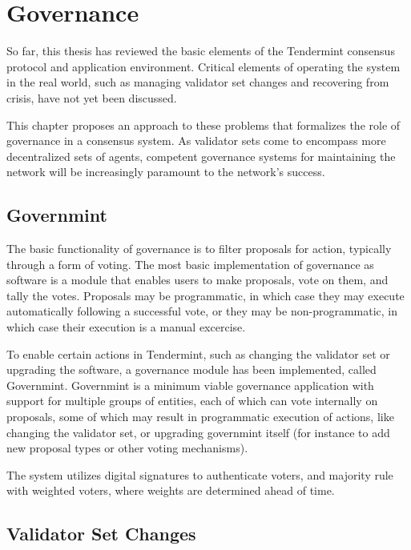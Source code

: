 \chapter{Governance}
\label{ch:governance}

So far, this thesis has reviewed the basic elements of the Tendermint consensus protocol and application environment.
Critical elements of operating the system in the real world, such as managing validator set changes
and recovering from crisis, have not yet been discussed. 

This chapter proposes an approach to these problems that formalizes the role of governance in a consensus system.
As validator sets come to encompass more decentralized sets of agents, competent governance systems 
for maintaining the network will be increasingly paramount to the network's success.

\section{Governmint}

The basic functionality of governance is to filter proposals for action, typically through a form of voting.
The most basic implementation of governance as software is a module that enables users to make proposals,
vote on them, and tally the votes. 
Proposals may be programmatic, in which case they may execute automatically following a successful vote,
or they may be non-programmatic, in which case their execution is a manual excercise.

To enable certain actions in Tendermint, such as changing the validator set or upgrading the software,
a governance module has been implemented, called Governmint.
Governmint is a minimum viable governance application with support for multiple groups of entities,
each of which can vote internally on proposals, some of which may result in programmatic execution of actions,
like changing the validator set, or upgrading governmint itself (for instance to add new proposal types or other voting mechanisms).

The system utilizes digital signatures to authenticate voters, 
and majority rule with weighted voters, where weights are determined ahead of time.

\section{Validator Set Changes}

